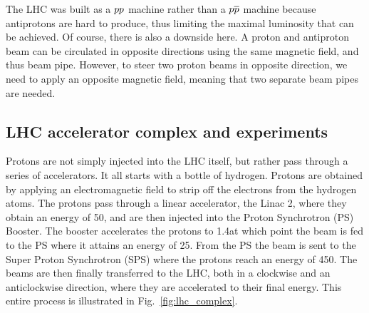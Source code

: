 The LHC was built as a ${p}{p}$ machine rather than a ${p}{\overline{p}}$ machine because antiprotons are
hard to produce, thus limiting the maximal luminosity that can be achieved. Of course,
there is also a downside here. A proton and antiproton beam can be circulated in opposite
directions using the same magnetic field, and thus beam pipe. However, to steer two proton beams in
opposite direction, we need to apply an opposite magnetic field, meaning that two separate beam
pipes are needed. 

\subsection{LHC accelerator complex and experiments}


Protons are not simply injected into the LHC itself, but rather pass through a series of
accelerators. 
It all starts with a bottle of hydrogen. Protons are obtained by applying an electromagnetic field
to strip off the electrons from the hydrogen atoms. The protons pass through a linear accelerator,
the Linac 2, where they obtain an energy of 50\MeV, and are then injected into the Proton
Synchrotron (PS) Booster. The booster accelerates the protons to 1.4\GeV at which point the beam is
fed to the PS where it attains an energy of 25\GeV. From the PS the beam is sent to the Super Proton
Synchrotron (SPS) where the protons reach an energy of 450\GeV. 
The beams are then finally transferred to the LHC, both in a clockwise and an anticlockwise
direction, where they are accelerated to their final energy. This entire process is illustrated in
Fig.~\ref{fig:lhc_complex}. 

